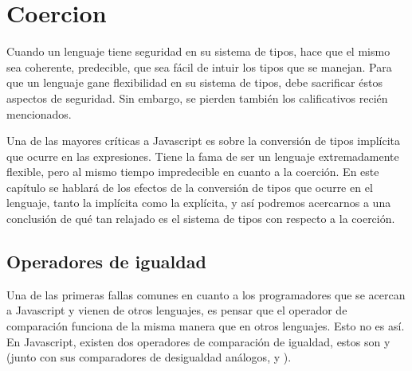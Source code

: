 \chapter{Coercion} %

\label{ch:coercion} %

Cuando un lenguaje tiene seguridad en su sistema de tipos, hace que el mismo sea coherente, predecible, que sea fácil de intuir los tipos que se manejan. Para que un lenguaje gane flexibilidad en su sistema de tipos, debe sacrificar éstos aspectos de seguridad. Sin embargo, se pierden también los calificativos recién mencionados.

Una de las mayores críticas a Javascript es sobre la conversión de tipos implícita que ocurre en las expresiones. Tiene la fama de ser un lenguaje extremadamente flexible, pero al mismo tiempo impredecible en cuanto a la coerción. En este capítulo se hablará de los efectos de la conversión de tipos que ocurre en el lenguaje, tanto la implícita como la explícita, y así podremos acercarnos a una conclusión de qué tan relajado es el sistema de tipos con respecto a la coerción.

\section{Operadores de igualdad}
\label{sec:eqeqeq}

Una de las primeras fallas comunes en cuanto a los programadores que se acercan a Javascript y vienen de otros lenguajes, es pensar que el operador de comparación \code{==} funciona de la misma manera que en otros lenguajes. Esto no es así. En Javascript, existen dos operadores de comparación de igualdad, estos son \code{==} y \code{===} (junto con sus comparadores de desigualdad análogos, \code{!=} y \code{!==}).
 

